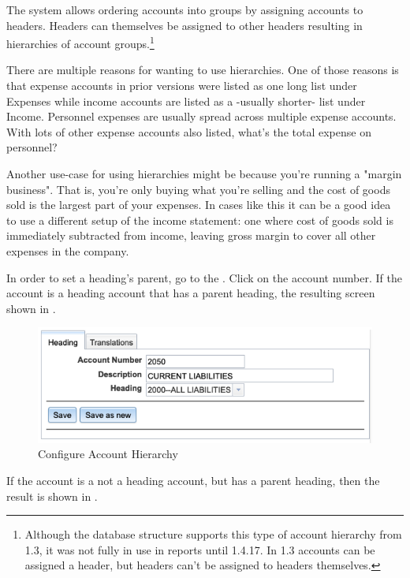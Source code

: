 The system allows ordering accounts into groups by assigning accounts to headers. Headers
can themselves be assigned to other headers resulting in hierarchies of account groups.\footnote{Although the
    database structure supports this type of account hierarchy from  1.3, it was not fully in use in reports until  1.4.17. In 1.3 accounts can be assigned a header,
    but headers can't be assigned to headers themselves.}

There are multiple reasons for wanting to use hierarchies. One of those reasons is that expense accounts in prior versions were listed as one long list under Expenses while income accounts are listed as a -usually shorter- list under Income. Personnel expenses are usually spread across multiple expense accounts. With lots of other expense accounts also listed, what's the total expense on personnel?

Another use-case for using hierarchies might be because you're running a "margin business". That is, you're only buying what you're selling and the cost of goods sold is the largest part of your expenses. In cases like this it can be a good idea to use a different setup of the income statement: one where cost of goods sold is immediately subtracted from income, leaving gross margin to cover all other expenses in the company.

In order to set a heading's parent, go to the . Click on the account number. If the account is a heading account that has a parent heading, the resulting screen shown in .

\begin{figure}[H]
    \centering
    \includegraphics[width=\graphicswidth]{images/gl-coa-heading.png}
    \caption{Configure Account Hierarchy}
    \label{fig:config-coa-hierarchy}
\end{figure}

If the account is a not a heading account, but has a parent heading, then the result is shown in .

